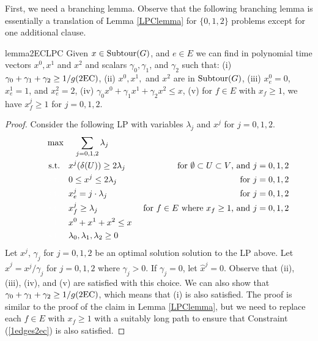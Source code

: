 First, we need a branching lemma. Observe that  the following branching lemma is essentially a translation of Lemma \ref{LPClemma} for $\{0,1,2\}$ problems except for one additional clause. 

\begin{restatable}{lemma}{2ECLPC}
	\label{LPC2EC}
	Given $x\in \operatorname{{Subtour}}(G)$, and $e\in E$ we can find in polynomial time vectors $x^0,x^1$ and $x^2$ and scalars $\gamma_0,\gamma_1$, and $\gamma_2$ such that: (i) $\gamma_0 + \gamma_1 +\gamma_2 \geq { 1}/{g(\2ec)}$, (ii) $x^0,x^1,$ and $x^2$ are in  $ \operatorname{{Subtour}}(G)$, (iii) $x^0_e=0$, $x^1_e=1$, and $x^2_e=2$, (iv) $\gamma_0 x^0 + \gamma_1{x}^1  + \gamma_2x^2\leq {x}$, (v) for $f\in E$ with ${x}_f\geq 1$, we have $x^j_f\geq 1$ for $j=0,1,2$.
\end{restatable}

\begin{proof}
	Consider the following LP with variables $\lambda_j$ and $x^j$ for $j=0,1,2$. 
	\begin{align}
	\quad\quad& \max\quad \;\sum_{j=0,1,2}\lambda_j\\
	&\;\text{s.t.} \quad x^j(\delta(U))\geq 2\lambda_j \;& \mbox{ for $\emptyset \subset U \subset V$, and $j=0,1,2$} \label{feasibility2ec}\\
	&\;{\color{white}{\text{s.t.}} }\quad 0 \leq x^j \leq 2\lambda_j\; &\mbox{ for $j=0,1,2$}\label{bound2ec}\\
	&\;{\color{white}{\text{s.t.}} }\quad x^j_e =j\cdot \lambda_j\; &\mbox{ for $j=0,1,2$}\label{branchcoordinate2ec}\\
	&\;{\color{white}{\text{s.t.}} }\quad x^j_f \geq \lambda_j \; &\mbox{ for $f\in E$ where $x_f \geq 1$, and $j=0,1,2$}\label{1edges2ec}\\
	&\;{\color{white}{\text{s.t.}} }\quad x^0 + x^1+x^2 \leq x\label{packing2ec}\\
	&\;{\color{white}{\text{s.t.}} }\quad \lambda_0,\lambda_1,\lambda_2 \geq 0
	\end{align}	Let $x^j$, $\gamma_j$ for $j=0,1,2$ be an optimal solution solution to the LP above. Let $\hat{x}^{j}={x^j}/{\gamma_j}$ for $j=0,1,2$ where $\gamma_j>0$. If $\gamma_j=0$, let $\hat{x}^{j}=0$. Observe that  (ii), (iii), (iv), and (v) are satisfied with this choice. We can also show that $\gamma_0+\gamma_1+\gamma_2\geq {1}/{g(\2ec)}$, which means that (i) is also satisfied. The proof is similar to the proof of the claim in Lemma \ref{LPClemma}, but we need to replace each $f\in E$ with $x_f\geq 1$ with a suitably long path to ensure that Constraint (\ref{1edges2ec}) is also satisfied.	

\end{proof}
